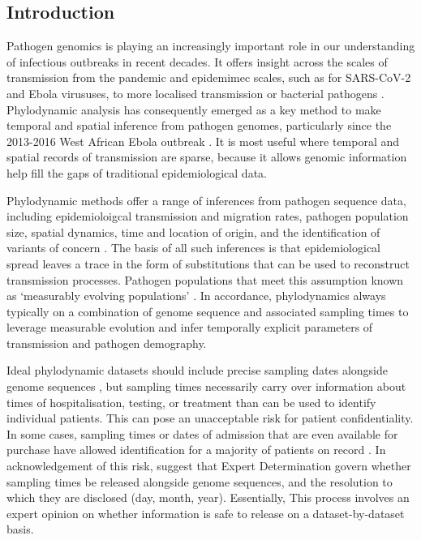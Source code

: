 \documentclass{article}
\begin{document}
\begin{spacing}{1.5}
\section*{Introduction}
Pathogen genomics is playing an increasingly important role in our understanding of infectious outbreaks in recent decades. It offers insight across the scales of transmission from the pandemic and epidemimec scales, such as for SARS-CoV-2 and Ebola virususes, to more localised transmission or bacterial pathogens \citep{lancet2021genomic}. Phylodynamic analysis has consequently emerged as a key method to make temporal and spatial inference from pathogen genomes, particularly since the 2013-2016 West African Ebola outbreak \citep{mbala2019medical}. It is most useful where temporal and spatial records of transmission are sparse, because it allows genomic information help fill the gaps of traditional epidemiological data.

Phylodynamic methods offer a range of inferences from pathogen sequence data, including epidemioloigcal transmission and migration rates, pathogen population size, spatial dynamics, time and location of origin, and the identification of variants of concern \citep{featherstone2022epidemiological, attwood2022phylogenetic, du2015getting,volz_fitness_2023}. The basis of all such inferences is that epidemiological spread leaves a trace in the form of substitutions that can be used to reconstruct transmission processes. Pathogen populations that meet this assumption known as `measurably evolving populations' \citep{drummond2003measurably, biek_measurably_2015}. In accordance, phylodynamics always typically on a combination of genome sequence and associated sampling times to leverage measurable evolution and infer temporally explicit parameters of transmission and pathogen demography.

Ideal phylodynamic datasets should include precise sampling dates alongside genome sequences \citep{black2020ten}, but sampling times necessarily carry over information about times of hospitalisation, testing, or treatment than can be used to identify individual patients. This can pose an unacceptable risk for patient confidentiality. In some cases, sampling times or dates of admission that are even available for purchase have allowed identification for a majority of patients on record \citep{sweeney_matching_2013,shean_private_2018}. In acknowledgement of this risk, \citet{shean_private_2018} suggest that Expert Determination govern whether sampling times be released alongside genome sequences, and the resolution to which they are disclosed (day, month, year). Essentially, This process involves an expert opinion on whether information is safe to release on a dataset-by-dataset basis.


\end{spacing}
\end{document}
